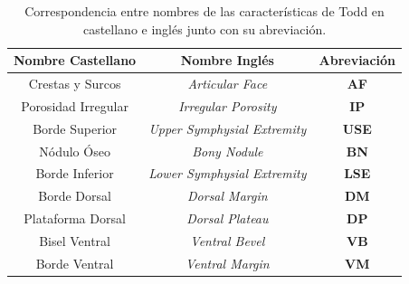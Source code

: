 \begin{table}[h]
    \centering
    \begin{tabular}{|c|c|c|}
    \hline
    \rowcolor[HTML]{D33333} 
    {\color[HTML]{FFFFFF} Nombre Castellano} & {\color[HTML]{FFFFFF} Nombre Inglés} & {\color[HTML]{FFFFFF} Abreviación} \\ \hline
    Crestas y Surcos & \textit{Articular Face} & \textbf{AF} \\ \hline
    Porosidad Irregular & \textit{Irregular Porosity} & \textbf{IP} \\ \hline
    Borde Superior & \textit{Upper Symphysial Extremity} & \textbf{USE} \\ \hline
    Nódulo Óseo & \textit{Bony Nodule} & \textbf{BN} \\ \hline
    Borde Inferior & \textit{Lower Symphysial Extremity} & \textbf{LSE} \\ \hline
    Borde Dorsal & \textit{Dorsal Margin} & \textbf{DM} \\ \hline
    Plataforma Dorsal & \textit{Dorsal Plateau} & \textbf{DP} \\ \hline
    Bisel Ventral & \textit{Ventral Bevel} & \textbf{VB} \\ \hline
    Borde Ventral & \textit{Ventral Margin} & \textbf{VM} \\ \hline
    \end{tabular}
    \caption{Correspondencia entre nombres de las características de Todd en castellano e inglés junto con su abreviación.}
    \label{table4:chars_short_names}
\end{table}

